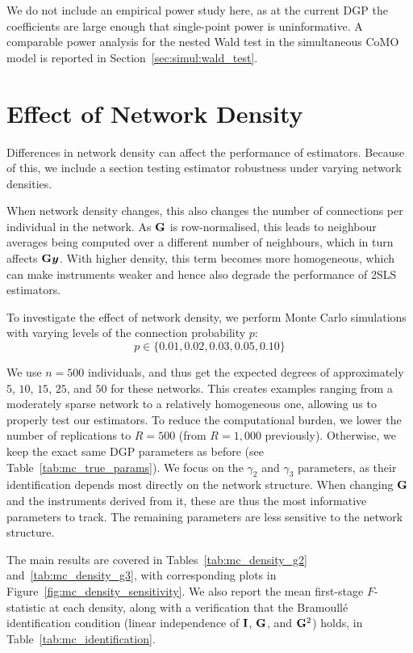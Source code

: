 We do not include an empirical power study here, as at the current DGP the coefficients are large enough that single-point power is uninformative. A comparable power analysis for the nested Wald test in the simultaneous CoMO model is reported in Section~\ref{sec:simul:wald_test}.

\section{Effect of Network Density}
\label{sec:mc:density}
Differences in network density can affect the performance of estimators. Because of this, we include a section testing estimator robustness under varying network densities.

When network density changes, this also changes the number of connections per individual in the network. As $\mathbf{G}$ is row-normalised, this leads to neighbour averages being computed over a different number of neighbours, which in turn affects $\mathbf{G}\bm{y}$. With higher density, this term becomes more homogeneous, which can make instruments weaker and hence also degrade the performance of 2SLS estimators.

To investigate the effect of network density, we perform Monte Carlo simulations with varying levels of the connection probability $p$:
\begin{equation}
    p \in \{0.01, 0.02, 0.03, 0.05, 0.10\}
\end{equation}

We use $n = 500$ individuals, and thus get the expected degrees of approximately $5$, $10$, $15$, $25$, and $50$ for these networks. This creates examples ranging from a moderately sparse network to a relatively homogeneous one, allowing us to properly test our estimators. To reduce the computational burden, we lower the number of replications to $R = 500$ (from $R = 1{,}000$ previously). Otherwise, we keep the exact same DGP parameters as before (see Table~\ref{tab:mc_true_params}). We focus on the $\gamma_2$ and $\gamma_3$ parameters, as their identification depends most directly on the network structure. When changing $\mathbf{G}$ and the instruments derived from it, these are thus the most informative parameters to track. The remaining parameters are less sensitive to the network structure.

The main results are covered in Tables~\ref{tab:mc_density_g2} and~\ref{tab:mc_density_g3}, with corresponding plots in Figure~\ref{fig:mc_density_sensitivity}. We also report the mean first-stage $F$-statistic at each density, along with a verification that the Bramoull\'e identification condition (linear independence of $\mathbf{I}$, $\mathbf{G}$, and $\mathbf{G}^2$) holds, in Table~\ref{tab:mc_identification}.

